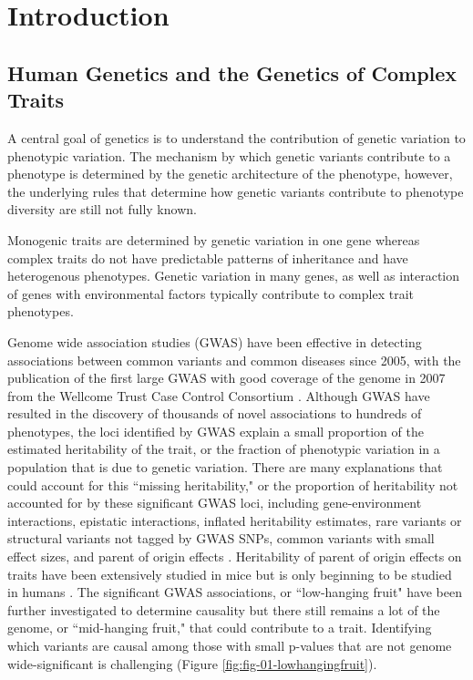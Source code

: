 
\chapter{Introduction}

\section{Human Genetics and the Genetics of Complex Traits}

A central goal of genetics is to understand the contribution of genetic variation to phenotypic variation. The mechanism by which genetic variants contribute to a phenotype is determined by the genetic architecture of the phenotype, however, the underlying rules that determine how genetic variants contribute to phenotype diversity are still not fully known. 

Monogenic traits are determined by genetic variation in one gene whereas complex traits do not have predictable patterns of inheritance and have heterogenous phenotypes. Genetic variation in many genes, as well as interaction of genes with environmental factors typically contribute to complex trait phenotypes. 

Genome wide association studies (GWAS) have been effective in detecting associations between common variants and common diseases since 2005, with the publication of the first large GWAS with good coverage of the genome in 2007 from the Wellcome Trust Case Control Consortium \cite{WellcomeTrustCaseControlConsortium:2007do}. Although GWAS have resulted in the discovery of thousands of novel associations to hundreds of phenotypes, the loci identified by GWAS explain a small proportion of the estimated heritability of the trait, or the fraction of phenotypic variation in a population that is due to genetic variation. There are many explanations that could account for this ``missing heritability," or the proportion of heritability not accounted for by these significant GWAS loci, including gene-environment interactions, epistatic interactions, inflated heritability estimates, rare variants or structural variants not tagged by GWAS SNPs, common variants with small effect sizes, and parent of origin effects \cite{Zaitlen2013,Eichler:2010kd,Gibson:2012kc,Zuk:cc}. Heritability of parent of origin effects on traits have been extensively studied in mice \cite{Babak2008,Mott2014,Babak2015,Babak2012} but is only beginning to be studied in humans \cite{Laurin:2017jv}. The significant GWAS associations, or ``low-hanging fruit" have been further investigated to determine causality but there still remains a lot of the genome, or ``mid-hanging fruit," that could contribute to a trait. Identifying which variants are causal among those with small p-values that are not genome wide-significant is challenging (Figure \ref{fig:fig-01-lowhangingfruit}).

